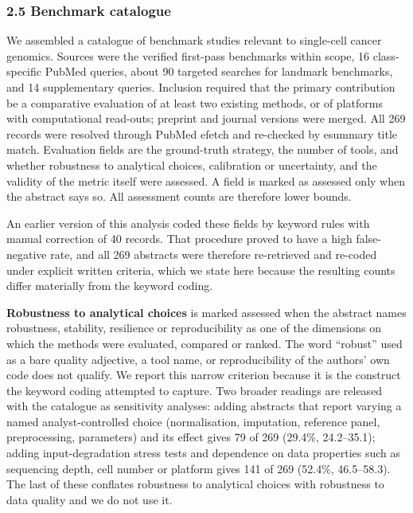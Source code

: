 \documentclass[11pt]{article}
\begin{document}
\subsubsection{2.5 Benchmark catalogue}\label{benchmark-catalogue}

We assembled a catalogue of benchmark studies relevant to single-cell
cancer genomics. Sources were the verified first-pass benchmarks within
scope, 16 class-specific PubMed queries, about 90 targeted searches for
landmark benchmarks, and 14 supplementary queries. Inclusion required
that the primary contribution be a comparative evaluation of at least
two existing methods, or of platforms with computational read-outs;
preprint and journal versions were merged. All 269 records were resolved
through PubMed efetch and re-checked by esummary title match. Evaluation
fields are the ground-truth strategy, the number of tools, and whether
robustness to analytical choices, calibration or uncertainty, and the
validity of the metric itself were assessed. A field is marked as
assessed only when the abstract says so. All assessment counts are
therefore lower bounds.

An earlier version of this analysis coded these fields by keyword rules
with manual correction of 40 records. That procedure proved to have a
high false-negative rate, and all 269 abstracts were therefore
re-retrieved and re-coded under explicit written criteria, which we
state here because the resulting counts differ materially from the
keyword coding.

\textbf{Robustness to analytical choices} is marked assessed when the
abstract names robustness, stability, resilience or reproducibility as
one of the dimensions on which the methods were evaluated, compared or
ranked. The word ``robust'' used as a bare quality adjective, a tool
name, or reproducibility of the authors' own code does not qualify. We
report this narrow criterion because it is the construct the keyword
coding attempted to capture. Two broader readings are released with the
catalogue as sensitivity analyses: adding abstracts that report varying
a named analyst-controlled choice (normalisation, imputation, reference
panel, preprocessing, parameters) and its effect gives 79 of 269
(29.4\%, 24.2--35.1); adding input-degradation stress tests and
dependence on data properties such as sequencing depth, cell number or
platform gives 141 of 269 (52.4\%, 46.5--58.3). The last of these
conflates robustness to analytical choices with robustness to data
quality and we do not use it.
\end{document}
